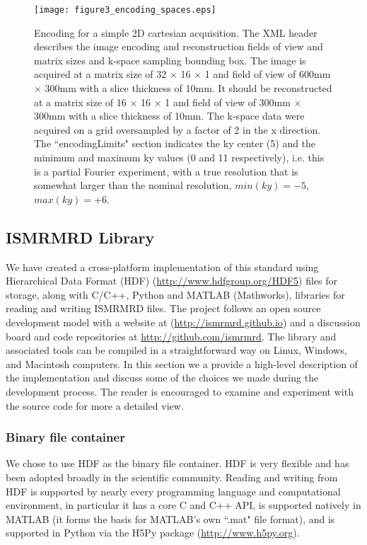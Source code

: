 \documentclass[12pt]{article}
\begin{document}
\begin{figure}
\begin{center}
\texttt{[image: figure3\_encoding\_spaces.eps]}
\caption{Encoding for a simple 2D cartesian acquisition.  The XML header describes the image encoding and reconstruction fields of view and matrix sizes and k-space sampling bounding box.  The image is acquired at a matrix size of 32 $\times$ 16 $\times$ 1 and field of view of 600mm $\times$ 300mm with a slice thickness of 10mm.  It should be reconstructed at a matrix size of 16 $\times$ 16 $\times$ 1 and field of view of 300mm $\times$ 300mm with a slice thickness of 10mm.   The k-space data were acquired on a grid oversampled by a factor of 2 in the x direction.  The ``encodingLimits" section indicates the ky center (5) and the minimum and maximum ky values (0 and 11 respectively), i.e. this is a partial Fourier experiment, with a true resolution that is somewhat larger than the nominal resolution, $min(ky)=-5$, $max(ky)=+6$.}
\label{fig:encoding}
\end{center}
\end{figure}


\subsection*{ISMRMRD Library}
We have created a cross-platform implementation of this standard using Hierarchical Data Format (HDF) (\url{http://www.hdfgroup.org/HDF5}) files for storage, along with C/C++, Python and MATLAB (Mathworks), libraries for reading and writing ISMRMRD files.  The project follows an open source development model with a website at (\url{http://ismrmrd.github.io}) and a discussion board and code repositories at \url{http://github.com/ismrmrd}.  The library and associated tools can be compiled in a straightforward way on Linux, Windows, and Macintosh computers.  In this section we a provide a high-level description of the implementation and discuss some of the choices we made during the development process.  The reader is encouraged to examine and experiment with the source code for more a detailed view.

\subsubsection*{Binary file container}
We chose to use HDF as the binary file container.  HDF is very flexible and has been adopted broadly in the scientific community.  Reading and writing from HDF is supported by nearly every programming language and computational environment, in particular it has a core C and C++ API, is supported natively in MATLAB (it forms the basis for MATLAB's own ``.mat" file format), and is supported in Python via the H5Py package (\url{http://www.h5py.org}).
\end{document}
